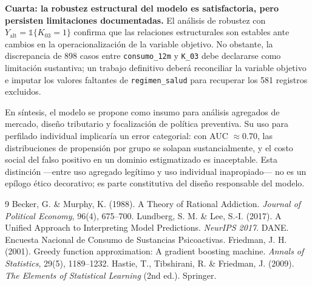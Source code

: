 \documentclass[12pt, a4paper]{article}
\begin{document}
\textbf{Cuarta: la robustez estructural del modelo es satisfactoria, pero persisten limitaciones documentadas.} El análisis de robustez con $Y_{\text{alt}} = \mathbb{1}\{K_{03} = 1\}$ confirma que las relaciones estructurales son estables ante cambios en la operacionalización de la variable objetivo. No obstante, la discrepancia de 898 casos entre \texttt{consumo\_12m} y \texttt{K\_03} debe declararse como limitación sustantiva; un trabajo definitivo deberá reconciliar la variable objetivo e imputar los valores faltantes de \texttt{regimen\_salud} para recuperar los 581 registros excluidos.

En síntesis, el modelo se propone como insumo para análisis agregados de mercado, diseño tributario y focalización de política preventiva. Su uso para perfilado individual implicaría un error categorial: con AUC $\approx 0.70$, las distribuciones de propensión por grupo se solapan sustancialmente, y el costo social del falso positivo en un dominio estigmatizado es inaceptable. Esta distinción —entre uso agregado legítimo y uso individual inapropiado— no es un epílogo ético decorativo; es parte constitutiva del diseño responsable del modelo.

\begin{thebibliography}{9}
 Becker, G. \& Murphy, K. (1988). A Theory of Rational Addiction. \textit{Journal of Political Economy}, 96(4), 675--700.
 Lundberg, S. M. \& Lee, S.-I. (2017). A Unified Approach to Interpreting Model Predictions. \textit{NeurIPS 2017}.
 DANE. Encuesta Nacional de Consumo de Sustancias Psicoactivas.
 Friedman, J. H. (2001). Greedy function approximation: A gradient boosting machine. \textit{Annals of Statistics}, 29(5), 1189--1232.
 Hastie, T., Tibshirani, R. \& Friedman, J. (2009). \textit{The Elements of Statistical Learning} (2nd ed.). Springer.
\end{thebibliography}
\end{document}
